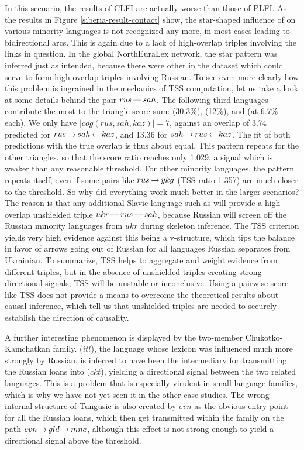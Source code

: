  In this scenario, the results of CLFI are actually worse than those of PLFI. As the results in Figure \ref{siberia-result-contact} show, the star-shaped influence of  on various minority languages is not recognized any more, in most cases leading to bidirectional arcs. This is again due to a lack of high-overlap triples involving the links in question. In the global NorthEuraLex network, the star pattern was inferred just as intended, because there were other  in the dataset which could serve to form high-overlap triples involving Russian. To see even more clearly how this problem is ingrained in the mechanics of TSS computation, let us take a look at some details behind the pair $rus \kern 2pt\hbox{---}\kern 2pt sah$. The following third languages contribute the most to the triangle score sum:  (30.3\%),  (12\%),  and  (at 6.7\% each). We only have $|cog(rus,sah,kaz)| = 7$, against an overlap of 3.74 predicted for $rus \kern 2pt\hbox{$\rightarrow$}\kern 2pt sah \kern 2pt\hbox{$\leftarrow$}\kern 2pt 
kaz$, and 13.36 for $sah \kern 2pt\hbox{$\rightarrow$}\kern 2pt rus \kern 2pt\hbox{$\leftarrow$}\kern 2pt kaz$. The fit of both predictions with the true overlap is thus about equal. This pattern repeats for the other triangles, so that the score ratio reaches only 1.029, a signal which is weaker than any reasonable threshold. For other minority languages, the pattern repeats itself, even if some pairs like $rus \kern 2pt\hbox{$\rightarrow$}\kern 2pt ykg$ (TSS ratio 1.357) are much closer to the threshold. So why did everything work much better in the larger scenarios? The reason is that any additional Slavic language such as  will provide a high-overlap unshielded triple $ukr \kern 2pt\hbox{---}\kern 2pt rus \kern 2pt\hbox{---}\kern 2pt sah$, because Russian will screen off the Russian minority languages from $ukr$ during skeleton inference. The TSS criterion yields very high evidence against this being a v-structure, which tips the balance in favor of arrows going out of Russian for all languages Russian separates from Ukrainian. To summarize, TSS helps to aggregate and weight evidence from different triples, but in 
the absence of unshielded triples creating strong directional signals, TSS will be unstable or inconclusive. Using a pairwise score like TSS does not provide a means to overcome the theoretical results about causal inference, which tell us that unshielded triples are needed to securely establish the direction of causality.
 
 A further interesting phenomenon is displayed by the two-member Chukotko-Kamchatkan family.  ($itl$), the language whose lexicon was influenced much more strongly by Russian, is inferred to have been the intermediary for transmitting the Russian loans into  ($ckt$), yielding a directional signal between the two related languages. This is a problem that is especially virulent in small language families, which is why we have not yet seen it in the other case studies. The wrong internal structure of Tungusic is also created by $evn$ as the obvious entry point for all the Russian loans, which then get transmitted within the family on the path $evn \kern 2pt\hbox{$\rightarrow$}\kern 2pt gld \kern 2pt\hbox{$\rightarrow$}\kern 2pt mnc$, although this effect is not strong enough to yield a directional signal above the threshold.
 
